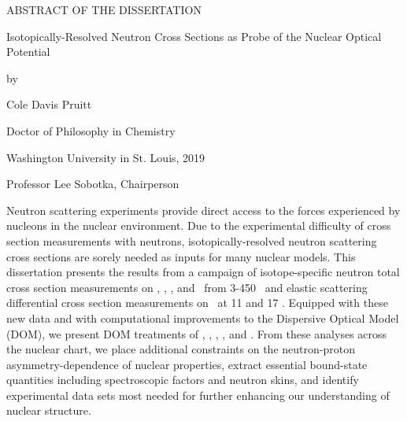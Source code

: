 \thispagestyle{plain}
\begin{center}

    ABSTRACT OF THE DISSERTATION

    Isotopically-Resolved Neutron Cross Sections as
    Probe of the Nuclear Optical Potential

    \vspace{0.5 cm}

    by

    \vspace{0.2 cm}

    Cole Davis Pruitt

    \vspace{0.2 cm}

    Doctor of Philosophy in Chemistry

    \vspace{0.2 cm}

    Washington University in St. Louis, 2019

    \vspace{0.2cm}

    Professor Lee Sobotka, Chairperson
\end{center}

\vspace{1cm}

Neutron scattering experiments provide direct access to the forces experienced by nucleons in the
nuclear environment. Due to the experimental difficulty of cross section
measurements with neutrons, isotopically-resolved neutron scattering cross sections are sorely
needed as inputs for many nuclear models.
This dissertation presents the results from a campaign of
isotope-specific neutron total cross section measurements on \oSixEight, \niEightFour,
\snTwelveFour, and \rhThree\ from
3-450 \mega\electronvolt\ and elastic scattering differential cross section measurements on
\snTwelveNatFour\ at 11 and 17 \mega\electronvolt. Equipped with these new data and
with computational improvements to the Dispersive Optical Model (DOM),
we present DOM treatments of \oSixEight, \caAughtEight, \niEightFour, 
\snTwelveFour, and \pbEight. From these analyses across the nuclear chart, we place additional 
constraints on the neutron-proton asymmetry-dependence of nuclear properties, extract essential bound-state 
quantities including spectroscopic factors and neutron skins, and identify experimental data sets 
most needed for further enhancing our understanding of nuclear structure.

